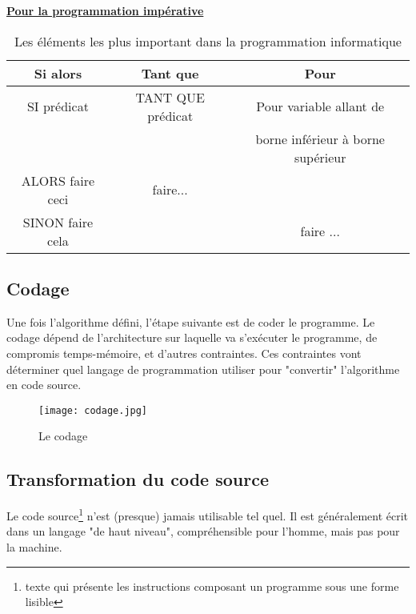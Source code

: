 \documentclass[12pt,a4paper]{article}
\begin{document}
\textbf{\underline{Pour la programmation impérative}}\\
\begin{table}[!h]
\centering
 \begin{tabular}{|c|c|c|} \\ \hline
  Si alors & Tant que & Pour \\ \hline
  SI prédicat         & TANT QUE prédicat   & Pour variable allant de  \\ 
      &               & borne inférieur à borne supérieur \\ 
    ALORS faire ceci  &          faire...   &                           \\ 
    SINON faire cela  &                     &                      faire ...\\ 
    \hline
 \end{tabular}
 \caption{Les éléments les plus important dans la programmation informatique}
 \label{1}
\end{table}
\subsection{Codage}
Une fois l'algorithme défini, l'étape suivante est de coder le 
programme. Le codage dépend de l'architecture sur laquelle va 
s'exécuter le programme, de compromis temps-mémoire, et d'autres 
contraintes. Ces contraintes vont déterminer quel langage de 
programmation utiliser pour "convertir" l'algorithme en code source.\\
\begin{figure}[ht]
 \centering
  \texttt{[image: codage.jpg]}
  \caption{Le codage}
  \label{fig:Le codage}
\end{figure}
\subsection{Transformation du code source}
Le code source\footnote{texte qui présente les 
instructions composant un programme sous une forme lisible} n'est (presque) 
jamais utilisable tel quel. Il est 
généralement écrit dans un langage "de haut niveau", compréhensible 
pour l'homme, mais pas pour la machine.\cite{article1}
\end{document}
